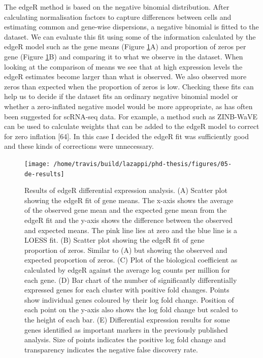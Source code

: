 \documentclass[11pt,a4paper,titlepage,twoside,openright]{style/unimelbthesis}
\theoremstyle{definition}
\theoremstyle{definition}
\theoremstyle{definition}
\theoremstyle{remark}
\begin{document}
\begin{mainmatter}
The edgeR method is based on the negative binomial distribution. After calculating normalisation factors to capture differences between cells and estimating common and gene-wise dispersions, a negative binomial is fitted to the dataset. We can evaluate this fit using some of the information calculated by the edgeR model such as the gene means (Figure \ref{fig:de-results}A) and proportion of zeros per gene (Figure \ref{fig:de-results}B) and comparing it to what we observe in the dataset. When looking at the comparison of means we see that at high expression levels the edgeR estimates become larger than what is observed. We also observed more zeros than expected when the proportion of zeros is low. Checking these fits can help us to decide if the dataset fits an ordinary negative binomial model or whether a zero-inflated negative model would be more appropriate, as has often been suggested for scRNA-seq data. For example, a method such as ZINB-WaVE can be used to calculate weights that can be added to the edgeR model to correct for zero inflation {[}64{]}. In this case I decided the edgeR fit was sufficiently good and these kinds of corrections were unnecessary.

\begin{figure}

{\centering \texttt{[image: /home/travis/build/lazappi/phd-thesis/figures/05-de-results]} 

}

\caption[Results of edgeR differential expression analysis.]{Results of edgeR differential expression analysis. (A) Scatter plot showing the edgeR fit of gene means. The x-axis shows the average of the observed gene mean and the expected gene mean from the edgeR fit and the y-axis shows the difference between the observed and expected means. The pink line lies at zero and the blue line is a LOESS fit. (B) Scatter plot showing the edgeR fit of gene proportion of zeros. Similar to (A) but showing the observed and expected proportion of zeros. (C) Plot of the biological coefficient as calculated by edgeR against the average log counts per million for each gene. (D) Bar chart of the number of significantly differentially expressed genes for each cluster with positive fold changes. Points show individual genes coloured by their log fold change. Position of each point on the y-axis also shows the log fold change but scaled to the height of each bar. (E) Differential expression results for some genes identified as important markers in the previously published analysis. Size of points indicates the positive log fold change and transparency indicates the negative false discovery rate.}\label{fig:de-results}
\end{figure}






\end{mainmatter}
\end{document}
